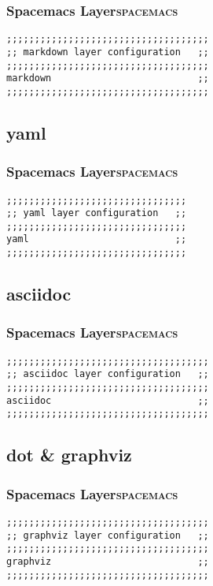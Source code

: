 \documentclass[11pt]{article}
\begin{document}
\subsubsection{Spacemacs Layer\hfill{}\textsc{spacemacs}}
\label{sec:org42b325e}
\begin{verbatim}
;;;;;;;;;;;;;;;;;;;;;;;;;;;;;;;;;;;;
;; markdown layer configuration   ;;
;;;;;;;;;;;;;;;;;;;;;;;;;;;;;;;;;;;;
markdown                          ;;
;;;;;;;;;;;;;;;;;;;;;;;;;;;;;;;;;;;;
\end{verbatim}

\subsection{yaml}
\label{sec:org1b0eb3a}
\subsubsection{Spacemacs Layer\hfill{}\textsc{spacemacs}}
\label{sec:org0426e4f}
\begin{verbatim}
;;;;;;;;;;;;;;;;;;;;;;;;;;;;;;;;
;; yaml layer configuration   ;;
;;;;;;;;;;;;;;;;;;;;;;;;;;;;;;;;
yaml                          ;;
;;;;;;;;;;;;;;;;;;;;;;;;;;;;;;;;
\end{verbatim}

\subsection{asciidoc}
\label{sec:org4f006bc}
\subsubsection{Spacemacs Layer\hfill{}\textsc{spacemacs}}
\label{sec:org7a1fd69}
\begin{verbatim}
;;;;;;;;;;;;;;;;;;;;;;;;;;;;;;;;;;;;
;; asciidoc layer configuration   ;;
;;;;;;;;;;;;;;;;;;;;;;;;;;;;;;;;;;;;
asciidoc                          ;;
;;;;;;;;;;;;;;;;;;;;;;;;;;;;;;;;;;;;
\end{verbatim}

\subsection{dot \& graphviz}
\label{sec:org7cf8bce}
\subsubsection{Spacemacs Layer\hfill{}\textsc{spacemacs}}
\label{sec:org7faeafc}
\begin{verbatim}
;;;;;;;;;;;;;;;;;;;;;;;;;;;;;;;;;;;;
;; graphviz layer configuration   ;;
;;;;;;;;;;;;;;;;;;;;;;;;;;;;;;;;;;;;
graphviz                          ;;
;;;;;;;;;;;;;;;;;;;;;;;;;;;;;;;;;;;;
\end{verbatim}
\end{document}
